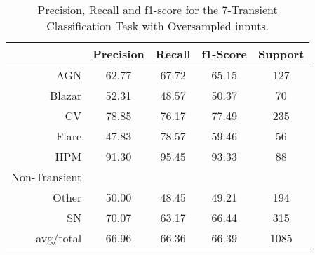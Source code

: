 \begin{table}
\centering
\begin{tabular}{|r|c|c|c|c|}
\hline
\multicolumn{1}{|l|}{} & Precision & Recall & f1-Score & Support \\ \hline \hline
AGN                    & 62.77              & 67.72             & 65.15             & 127             \\ \hline
Blazar                 & 52.31           & 48.57          & 50.37          & 70          \\ \hline
CV                     & 78.85               & 76.17              & 77.49              & 235              \\ \hline
Flare                  & 47.83            & 78.57           & 59.46           & 56           \\ \hline
HPM                    & 91.30              & 95.45             & 93.33             & 88             \\ \hline
Non-Transient          &     &    &    &    \\ \hline
Other                  & 50.00            & 48.45           & 49.21           & 194           \\ \hline
SN                     & 70.07               & 63.17              & 66.44              & 315              \\ \hline
avg/total              & 66.96            & 66.36           & 66.39           & 1085           \\ \hline
\end{tabular}
\caption{Precision, Recall and f1-score for the 7-Transient Classification Task with Oversampled inputs.}
\label{Overall-Scores-7-Transient-Oversampled}
\end{table}
